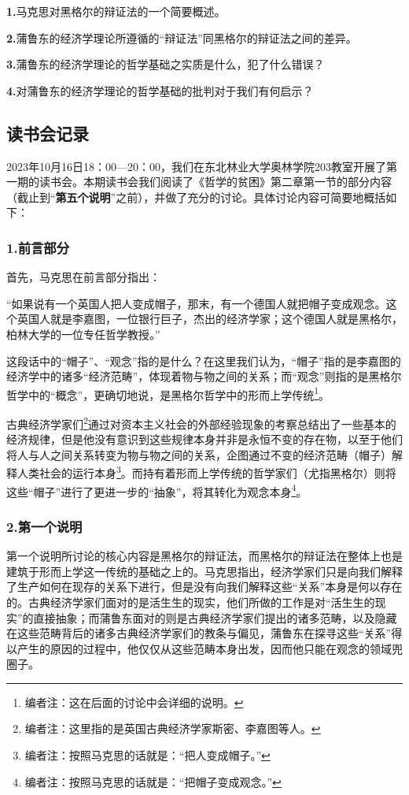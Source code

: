 \documentclass[a4paper,twoside,12pt,AutoFakeBold]{ctexart}
\begin{document}
\textbf{1.}马克思对黑格尔的辩证法的一个简要概述。

\textbf{2.}蒲鲁东的经济学理论所遵循的“辩证法”同黑格尔的辩证法之间的差异。

\textbf{3.}蒲鲁东的经济学理论的哲学基础之实质是什么，犯了什么错误？

\textbf{4.}对蒲鲁东的经济学理论的哲学基础的批判对于我们有何启示？

\subsection{读书会记录}
2023年10月16日18：00—20：00，我们在东北林业大学奥林学院203教室开展了第一期的读书会。本期读书会我们阅读了《哲学的贫困》第二章第一节的部分内容（截止到“\textbf{第五个说明}”之前），并做了充分的讨论。具体讨论内容可简要地概括如下：

\subsubsection{1.前言部分}\label{sec:3}

首先，马克思在前言部分指出：
\begin{adjustwidth}{2em}{2em}
\qquad\fangsong
“如果说有一个英国人把人变成帽子，那末，有一个德国人就把帽子变成观念。这个英国人就是李嘉图，一位银行巨子，杰出的经济学家；这个德国人就是黑格尔，柏林大学的一位专任哲学教授。”
\end{adjustwidth}

这段话中的“帽子”、“观念”指的是什么？在这里我们认为，“帽子”指的是李嘉图的经济学中的诸多“经济范畴”，体现着物与物之间的关系；而“观念”则指的是黑格尔哲学中的“概念”，更确切地说，是黑格尔哲学中的形而上学传统\footnote{编者注：这在后面的讨论中会详细的说明。}。

古典经济学家们\footnote{编者注：这里指的是英国古典经济学家斯密、李嘉图等人。}通过对资本主义社会的外部经验现象的考察总结出了一些基本的经济规律，但是他没有意识到这些规律本身并非是永恒不变的存在物，以至于他们将人与人之间关系转变为物与物之间的关系，企图通过不变的经济范畴（帽子）解释人类社会的运行本身\footnote{编者注：按照马克思的话就是：“把人变成帽子。”}。而持有着形而上学传统的哲学家们（尤指黑格尔）则将这些“帽子”进行了更进一步的“抽象”，将其转化为观念本身\footnote{编者注：按照马克思的话就是：“把帽子变成观念。”}。

\subsubsection{2.第一个说明}

第一个说明所讨论的核心内容是黑格尔的辩证法，而黑格尔的辩证法在整体上也是建筑于形而上学这一传统的基础之上的。马克思指出，经济学家们只是向我们解释了生产如何在现存的关系下进行，但是没有向我们解释这些“关系”本身是何以存在的。古典经济学家们面对的是活生生的现实，他们所做的工作是对“活生生的现实”的直接抽象；而蒲鲁东面对的则是古典经济学家们提出的诸多范畴，以及隐藏在这些范畴背后的诸多古典经济学家们的教条与偏见，蒲鲁东在探寻这些“关系”得以产生的原因的过程中，他仅仅从这些范畴本身出发，因而他只能在观念的领域兜圈子。
\end{document}
